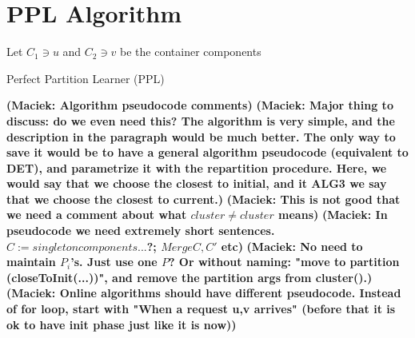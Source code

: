 \documentclass[manuscript,screen=true, review, anonymous]{acmart}
\newcommand{\PPL}{\textsf{PPL}\xspace}
\DeclarePairedDelimiter\set{\{}{\}}
\newcommand\maciek[1]{\color{brown}\textbf{(Maciek: #1)}\color{black}}
\begin{document}
\section{PPL Algorithm} \label{alg:PPL}
\begin{algorithm}
	\renewcommand{\algorithmicrequire}{\textbf{Input:}}
	\renewcommand{\algorithmicensure}{\textbf{Output:}}
	\begin{algorithmic}
		\label{line:initcomponents}
		\STATE Let $C_1 \ni u$ and $C_2 \ni v$ be the container components
		 \label{line:mergecomponents}
		\label{line:rebalance} 
		\ENDIF
		\ENDIF
		\ENDFOR
	\end{algorithmic}
	\caption{Perfect Partition Learner (\PPL)}
	\label{alg:ppl}
\end{algorithm}


\maciek{Algorithm pseudocode comments}
\maciek{Major thing to discuss: do we even need this? The algorithm is very simple, and the description in the paragraph would be much better. The only way to save it would be to have a general algorithm pseudocode (equivalent to DET), and parametrize it with the repartition procedure. Here, we would say that we choose the closest to initial, and it ALG3 we say that we choose the closest to current.}
\maciek{This is not good that we need a comment about what $cluster \neq cluster$ means}
\maciek{In pseudocode we need extremely short sentences. $C := singleton components ... $?; $Merge C, C'$ etc}
\maciek{No need to maintain $P_i$'s. Just use one $P$? Or without naming: "move to partition (closeToInit(...))", and remove the partition args from cluster().}
\maciek{Online algorithms should have different pseudocode. Instead of for loop, start with "When a request u,v arrives" (before that it is ok to have init phase just like it is now)}
\end{document}
